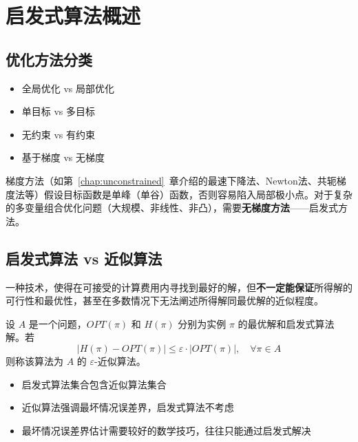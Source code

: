 \section{启发式算法概述}\label{sec:heuristic-overview}

\subsection{优化方法分类}

\begin{conceptbox}[优化方法的多维分类]
\begin{itemize}[itemsep=0.3em]
    \item 全局优化 vs 局部优化
    \item 单目标 vs 多目标
    \item 无约束 vs 有约束
    \item 基于梯度 vs 无梯度
\end{itemize}
\end{conceptbox}

\begin{notebox}[梯度方法的限制]
梯度方法（如第~\ref{chap:unconstrained}~章介绍的最速下降法、Newton法、共轭梯度法等）假设目标函数是单峰（单谷）函数，否则容易陷入局部极小点。对于复杂的多变量组合优化问题（大规模、非线性、非凸），需要\textbf{无梯度方法}——启发式方法。
\end{notebox}

\subsection{启发式算法 vs 近似算法}

\begin{definition}[启发式算法]
一种技术，使得在可接受的计算费用内寻找到最好的解，但\textbf{不一定能保证}所得解的可行性和最优性，甚至在多数情况下无法阐述所得解同最优解的近似程度。
\end{definition}

\begin{definition}
设 $A$ 是一个问题，$OPT(\pi)$ 和 $H(\pi)$ 分别为实例 $\pi$ 的最优解和启发式算法解。若
\[
|H(\pi) - OPT(\pi)| \leq \varepsilon \cdot |OPT(\pi)|,\quad \forall \pi \in A
\]
则称该算法为 $A$ 的 $\varepsilon$-近似算法。
\end{definition}

\begin{property}[启发式与近似的区别]
\begin{itemize}[itemsep=0.3em]
    \item 启发式算法集合包含近似算法集合
    \item 近似算法强调最坏情况误差界，启发式算法不考虑
    \item 最坏情况误差界估计需要较好的数学技巧，往往只能通过启发式解决
\end{itemize}
\end{property}

